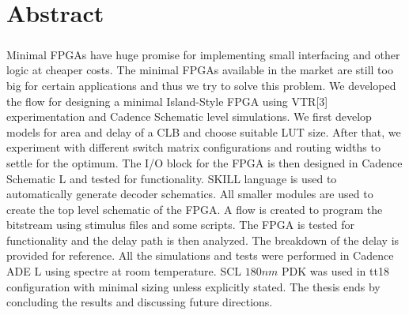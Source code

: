 %
%
%

\chapter*{Abstract}
\begin{OnehalfSpacing}
\paragraph{}
\end{OnehalfSpacing}
Minimal FPGAs have huge promise for implementing small interfacing and other logic at cheaper costs. The minimal FPGAs available in the market are still too big for certain applications and thus we try to solve this problem. We developed the flow for designing a minimal Island-Style FPGA using VTR[3] experimentation and Cadence Schematic level simulations. We first develop models for area and delay of a CLB and choose suitable LUT size. After that, we experiment with different switch matrix configurations and routing widths to settle for the optimum. The I/O block for the FPGA is then designed in Cadence Schematic L and tested for functionality. SKILL language is used to automatically generate decoder schematics. All smaller modules are used to create the top level schematic of the FPGA. A flow is created to program the bitstream using stimulus files and some scripts. The FPGA is tested for functionality and the delay path is then analyzed. The breakdown of the delay is provided for reference. All the simulations and tests were performed in Cadence ADE L using spectre at room temperature. SCL $180nm$ PDK was used in tt18 configuration with minimal sizing unless explicitly stated. The thesis ends by concluding the results and discussing future directions.

\clearpage 
